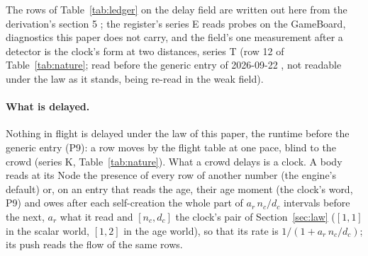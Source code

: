 The rows of Table~\ref{tab:ledger} on the delay field are written out
here from the derivation's section 5 \cite{derivations}; the register's
series E reads probes on the GameBoard, diagnostics this paper does not
carry, and the field's one measurement after a detector is the clock's
form at two distances, series T (row 12 of Table~\ref{tab:nature}; read before the generic entry of 2026-09-22 \cite{genericentry}, not readable under the law as it stands, being re-read in the weak field).

\paragraph{What is delayed.} Nothing in flight is delayed under the law of this paper, the runtime before the generic entry (P9): a row moves by the flight table at one pace, blind to the crowd (series K, Table~\ref{tab:nature}).
What a crowd delays is a clock. A body reads at its Node the presence
of every row of another number (the engine's default) or, on an entry
that reads the age, their age moment (the clock's word, P9) and owes after each self-creation the whole part of $a_r\,n_c/d_c$
intervals before the next, $a_r$ what it read and $[n_c, d_c]$ the clock's
pair of Section~\ref{sec:law} ($[1, 1]$ in the scalar world, $[1, 2]$ in the age
world), so that its rate is $1/(1 + a_r\,n_c/d_c)$; its push reads the flow of the same rows.

